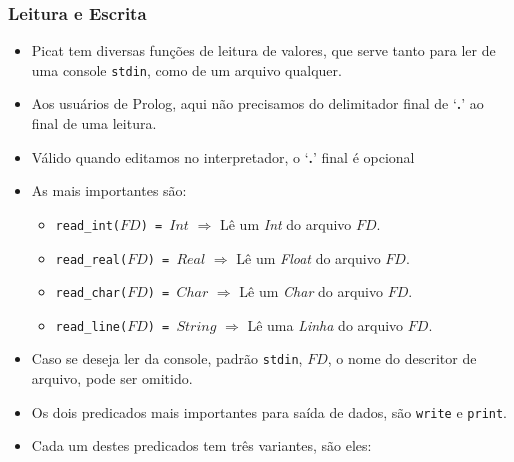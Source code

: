 \begin{frame}[c,allowframebreaks]

\frametitle{Leitura e Escrita}    

\begin{itemize}
        
\item Picat tem diversas  funções de leitura de valores,
        que serve tanto para ler de uma console \texttt{stdin},
        como de um arquivo qualquer.
        
\item Aos usuários de Prolog, aqui não precisamos do delimitador
final de `\textbf{.}'   ao final de uma leitura. 

\item Válido quando editamos no interpretador, o `\textbf{.}' final é opcional
        
\framebreak        
\item As mais importantes são:

\begin{itemize}
  
  \item \texttt{read\_int($FD$) = $Int$} $\Rightarrow$ Lê um \textit{Int} do 
  arquivo $FD$.
  
  \item \texttt{read\_real($FD$) = $Real$} $\Rightarrow$ Lê um \textit{Float} do 
  arquivo $FD$.
  
  \item \texttt{read\_char($FD$) = $Char$} $\Rightarrow$ Lê um \textit{Char} do 
  arquivo $FD$.
  
  \item \texttt{read\_line($FD$) = $String$} $\Rightarrow$ Lê uma \textit{Linha} 
  do arquivo $FD$.
  
\end{itemize}

\item Caso se deseja ler da console, padrão \texttt{stdin}, $FD$, o nome do descritor de arquivo,  pode ser omitido.

\framebreak

\item Os dois predicados mais importantes para saída de dados, são 
\texttt{write} e \texttt{print}.

\item Cada um destes predicados tem três variantes, são eles:

\begin{itemize}


\end{itemize}
\end{itemize}
\end{frame}
